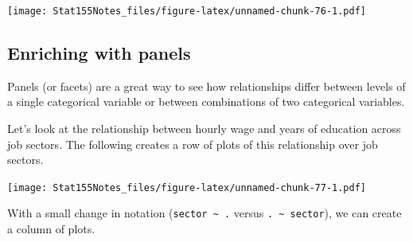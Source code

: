 \documentclass[]{book}
\newenvironment{Shaded}{\begin{snugshade}}{\end{snugshade}}
\newcommand{\DataTypeTok}[1]{\textcolor[rgb]{0.13,0.29,0.53}{#1}}
\newcommand{\KeywordTok}[1]{\textcolor[rgb]{0.13,0.29,0.53}{\textbf{#1}}}
\newcommand{\NormalTok}[1]{#1}
\newcommand{\OperatorTok}[1]{\textcolor[rgb]{0.81,0.36,0.00}{\textbf{#1}}}
\newcommand{\StringTok}[1]{\textcolor[rgb]{0.31,0.60,0.02}{#1}}
\begin{document}
\texttt{[image: Stat155Notes\_files/figure-latex/unnamed-chunk-76-1.pdf]}

\hypertarget{enriching-with-panels}{%
\subsection{Enriching with panels}\label{enriching-with-panels}}

Panels (or facets) are a great way to see how relationships differ between levels of a single categorical variable or between combinations of two categorical variables.

Let's look at the relationship between hourly wage and years of education across job sectors. The following creates a row of plots of this relationship over job sectors.

\begin{Shaded}
\end{Shaded}

\texttt{[image: Stat155Notes\_files/figure-latex/unnamed-chunk-77-1.pdf]}

With a small change in notation (\texttt{sector\ \textasciitilde{}\ .} versus \texttt{.\ \textasciitilde{}\ sector}), we can create a column of plots.

\begin{Shaded}
\end{Shaded}
\end{document}
